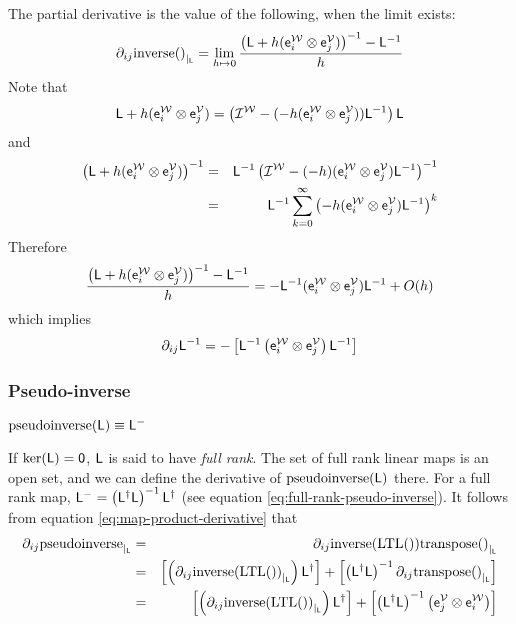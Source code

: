 The partial derivative is the value of the following, when the limit exists:
\begin{displaymath}
{\partial}_{ij}{\mathrm{inverse}()}_{\mid_{\mathsf{L}}}
 =
\lim_{ h \mapsto 0}
\frac{ \left( \mathsf{L} + h (\mathsf{e}_i^{\mathcal{W}} \otimes \mathsf{e}_j^{\mathcal{V}}) \right)^{-1} - \mathsf{L}^{-1} }{h}
\end{displaymath}
Note that
\begin{displaymath}
\mathsf{L} + h (\mathsf{e}_i^{\mathcal{W}} \otimes \mathsf{e}_j^{\mathcal{V}})
 =
\left( \mathcal{I}^{\mathcal{W}} - ( -h ( \mathsf{e}_i^{\mathcal{W}} \otimes \mathsf{e}_j^{\mathcal{V}} )) \mathsf{L}^{-1} \right) \mathsf{L}
\end{displaymath}
and
\begin{eqnarray*}
\left( \mathsf{L} + h (\mathsf{e}_i^{\mathcal{W}} \otimes \mathsf{e}_j^{\mathcal{V}}) \right)^{-1}
& = &
\mathsf{L}^{-1} \left( \mathcal{I}^{\mathcal{W}} - ( -h )( \mathsf{e}_i^{\mathcal{W}} \otimes \mathsf{e}_j^{\mathcal{V}} ) \mathsf{L}^{-1} \right)^{-1}
\\
& = &
\mathsf{L}^{-1} \sum_{k=0}^{\infty} \left( -h ( \mathsf{e}_i^{\mathcal{W}} \otimes \mathsf{e}_j^{\mathcal{V}} ) \mathsf{L}^{-1} \right)^{k}
\nonumber
\end{eqnarray*}
Therefore
\begin{displaymath}
\frac{ \left( \mathsf{L} + h (\mathsf{e}_i^{\mathcal{W}} \otimes \mathsf{e}_j^{\mathcal{V}}) \right)^{-1} - \mathsf{L}^{-1} }{h}
 =
- \mathsf{L}^{-1} ( \mathsf{e}_i^{\mathcal{W}} \otimes \mathsf{e}_j^{\mathcal{V}} )  \mathsf{L}^{-1} + O(h)
\end{displaymath}
which implies
\begin{equation}
{\partial}_{ij}{\mathsf{L}^{-1}}
 =
- \left[
\mathsf{L}^{-1}
\left( \mathsf{e}_i^{\mathcal{W}} \otimes \mathsf{e}_j^{\mathcal{V}} \right)
\mathsf{L}^{-1}
\right]
\end{equation}


\subsubsection{Pseudo-inverse}
\label{sec:Derivative-of-pseudo-inverse}

$\mathrm{pseudoinverse}(\mathsf{L}) \equiv \mathsf{L}^{-}$

If $\mathrm{ker}(\mathsf{L}) = {\mathsf 0}$, $\mathsf{L}$ is said to have {\it full rank}.
The set of full rank linear maps is an open set,
and we can define the derivative of $\mathrm{pseudoinverse}(\mathsf{L})$ there.
For a full rank map,
$\mathsf{L}^{-} = \left( \mathsf{L}^{\dagger} \mathsf{L} \right)^{-1} \mathsf{L}^{\dagger}$
(see equation \ref{eq:full-rank-pseudo-inverse}).
It follows from equation \ref{eq:map-product-derivative} that
\begin{eqnarray}
{\partial}_{ij}{\mathrm{pseudoinverse}}_{\mid_{\mathsf{L}}}
& = &
{\partial}_{ij}{\mathrm{inverse}(\mathrm{LTL}())\mathrm{transpose}()}_{\mid_{\mathsf{L}}}
\\
& = &
\left[
\left( {\partial}_{ij}{\mathrm{inverse}(\mathrm{LTL}())}_{\mid_{\mathsf{L}}} \right)
\mathsf{L}^{\dagger}
\right]
+
\left[
\left( \mathsf{L}^{\dagger} \mathsf{L} \right)^{-1}
{\partial}_{ij}{\mathrm{transpose}()}_{\mid_{\mathsf{L}}}
\right]
\nonumber
\\
& = &
\left[
\left( {\partial}_{ij}{\mathrm{inverse}(\mathrm{LTL}())}_{\mid_{\mathsf{L}}} \right)
\mathsf{L}^{\dagger}
\right]
+
\left[
\left( \mathsf{L}^{\dagger} \mathsf{L} \right)^{-1}
\left( \mathsf{e}_j^{\mathcal{V}} \otimes \mathsf{e}_i^{\mathcal{W}} \right)
\right]
\nonumber
\end{eqnarray}

